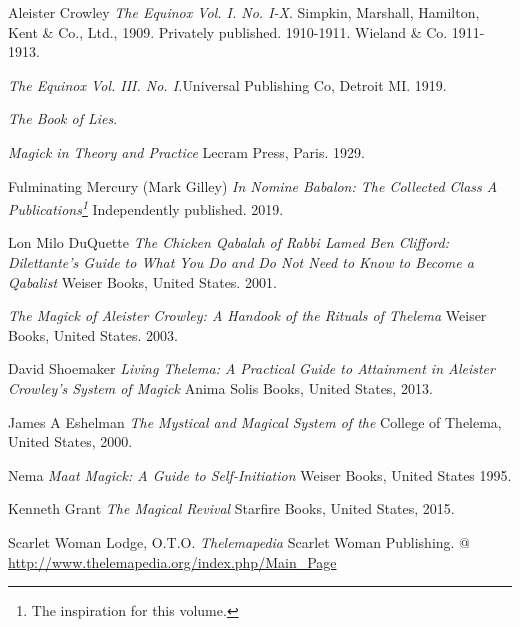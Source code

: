 \makeatletter
\renewcommand\@biblabel[1]{}
\makeatother
\renewcommand{\bibname}{\smaller Bibliography \& Additional Resources}
\begin{thebibliography}{10}
  Aleister Crowley
  \textit{The Equinox Vol. I. No. I-X}.\footnotemark{}
  Simpkin, Marshall, Hamilton, Kent \& Co., Ltd., 1909.
  Privately published. 1910-1911.
  Wieland \& Co. 1911-1913.

  \textemdash{}
  \textit{The Equinox Vol. III. No. I.}\footnotemark[\value{footnote}]
  Universal Publishing Co, Detroit MI. 1919.

  \textemdash{}
  \textit{The Book of Lies}.

  \textemdash{}
  \textit{Magick in Theory and Practice}\footnotemark[\value{footnote}]
  Lecram Press, Paris. 1929.

  Fulminating Mercury (Mark Gilley)
  \textit{In Nomine Babalon: The Collected Class A Publications\footnote{The inspiration for this volume.}}
  Independently published. 2019.

  Lon Milo DuQuette
  \textit{The Chicken Qabalah of Rabbi Lamed Ben Clifford: Dilettante's Guide to What You Do and Do Not Need to Know to Become a Qabalist}
  Weiser Books, United States. 2001.

  \textemdash{}
  \textit{The Magick of Aleister Crowley: A Handook of the Rituals of Thelema}
  Weiser Books, United States. 2003.

  David Shoemaker
  \textit{Living Thelema: A Practical Guide to Attainment in Aleister Crowley's System of Magick}
  Anima Solis Books, United States, 2013.

  James A Eshelman
  \textit{The Mystical and Magical System of the \Argentium{}}
  College of Thelema, United States, 2000.

  Nema
  \textit{Maat Magick: A Guide to Self-Initiation}
  Weiser Books, United States 1995.

  Kenneth Grant
  \textit{The Magical Revival}
  Starfire Books, United States, 2015.

  Scarlet Woman Lodge, O.T.O.
  \textit{Thelemapedia}
  Scarlet Woman Publishing.
  @ \url{http://www.thelemapedia.org/index.php/Main_Page}
\end{thebibliography}

